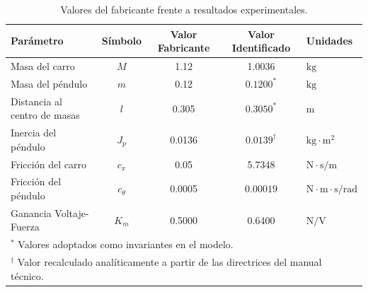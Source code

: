 \documentclass[11pt,fleqn]{book} %
\begin{document}
\begin{table}[htbp]
	\centering
	\caption{Valores del fabricante frente a resultados experimentales.}
	\label{tab:resumen_y_comparativa}
	\begin{tabular}{l c c c l}
		\toprule
		\textbf{Parámetro} & \textbf{Símbolo} & \textbf{Valor Fabricante} & \textbf{Valor Identificado} & \textbf{Unidades} \\
		\midrule
		Masa del carro               & $M$         & 1.12   & 1.0036          & $\mathrm{kg}$ \\
		Masa del péndulo             & $m$         & 0.12   & $0.1200^{\ast}$ & $\mathrm{kg}$ \\
		Distancia al centro de masas  & $l$         & 0.305  & $0.3050^{\ast}$ & $\mathrm{m}$ \\
		Inercia del péndulo          & $J_p$       & 0.0136 & $0.0139^{\dagger}$ & $\mathrm{kg \cdot m^2}$ \\
		Fricción del carro           & $c_x$       & 0.05   & 5.7348          & $\mathrm{N \cdot s / m}$ \\
		Fricción del péndulo         & $c_\theta$  & 0.0005 & $0.00019$       & $\mathrm{N \cdot m \cdot s / rad}$ \\
		Ganancia Voltaje-Fuerza      & $K_m$       & 0.5000 & 0.6400          & $\mathrm{N/V}$ \\
		\bottomrule
		\multicolumn{5}{l}{\small $^{\ast}$ Valores adoptados como invariantes en el modelo.} \\
		\multicolumn{5}{l}{\small $^{\dagger}$ Valor recalculado analíticamente a partir de las directrices del manual técnico.}
	\end{tabular}
\end{table}
\end{document}
